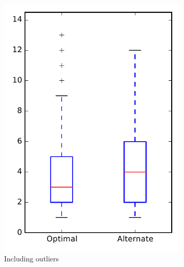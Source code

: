 
\begin{figure}
    \centering
    \begin{subfigure}{.4\textwidth}
        \centering
        \includegraphics[height=0.4\textheight]{figures/combo/dit_rq2_zookeeper}
        \caption{Including outliers}\label{fig:combo:dit:rq2:zookeeper_outlier}
    \end{subfigure}%
    \begin{subfigure}{.4\textwidth}
        \centering

\end{subfigure}
\end{figure}
